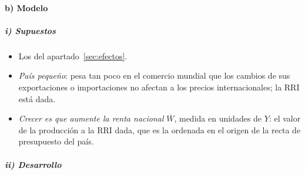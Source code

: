 \documentclass[11pt]{article}
\begin{document}
\paragraph{b) Modelo}

\subparagraph{i) Supuestos}

\begin{itemize}
\item Los del apartado~\ref{sec:efectos}.
\item \emph{País pequeño}: pesa tan poco en el comercio mundial que los cambios de sus exportaciones o importaciones no afectan a los precios internacionales; la RRI está dada.
\item \emph{Crecer es que aumente la renta nacional} $\overline W$, medida en unidades de $Y$: el valor de la producción a la RRI dada, que es la ordenada en el origen de la recta de presupuesto del país.
\end{itemize}

\subparagraph{ii) Desarrollo}
\end{document}
